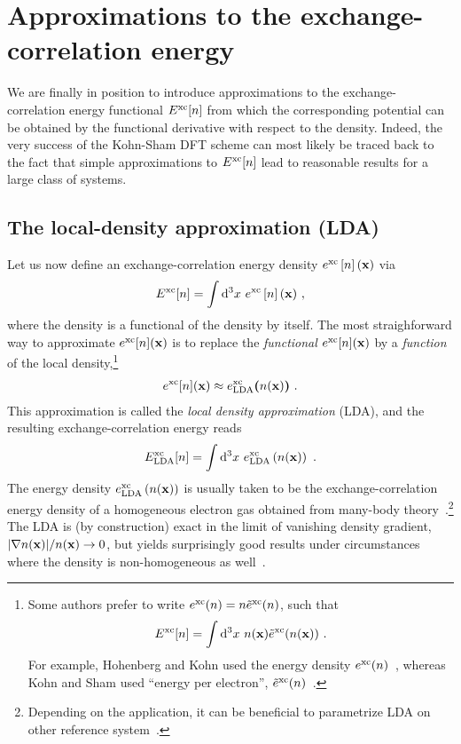 \section{Approximations to the exchange-correlation energy}
\label{sec:dft.approximations}
We are finally in position to introduce approximations to the exchange-correlation energy functional $E^{\rm xc}[n]$ from which the corresponding potential can be obtained by the functional derivative with respect to the density. Indeed, the very success of the Kohn-Sham DFT scheme can most likely be traced back to the fact that simple approximations to $E^{\rm xc}[n]$ lead to reasonable results for a large class of systems. 

\subsection{The local-density approximation (LDA)}

Let us now define an exchange-correlation energy density $e^{\rm xc} \left[ n \right] ({\bf x})$ via
\begin{align}
	E^{\rm xc}[n] 
		= \int \d^3 x ~ e^{\rm xc} \left[ n \right] ({\bf x})~,
\label{eq:dft.xc.1}
\end{align}
where the density is a functional of the density by itself.
%
The most straighforward way to approximate $e^{\rm xc}[n] ({\bf x})$ is to replace the \emph{functional} $e^{\rm xc} [n] ({\bf x})$ by a \emph{function} of the local density,\footnote{Some authors prefer to write 
  \mbox{$e^{\rm xc}(n) = n \tilde e^{\rm xc} (n)$}, such that
	\begin{align*}
		E^{\rm xc} [n] 
		  = \int {\rm d}^3 x ~ n({\bf x}) \tilde e^{\rm xc} (n ({\bf x}))~.
	\end{align*}
	For example, Hohenberg and Kohn used the energy density $e^{\rm xc} (n)$~\cite{Hohenberg.1964}, whereas Kohn and Sham used ``energy per electron'', $\tilde e^{\rm xc} (n)$~\cite{Kohn.1965}.
	}
%
\begin{align}
	e^{\rm xc} [n] ({\bf x})
		\approx e^{\rm xc}_{\rm LDA} \bm ( n({\bf x}) \bm )~.
	\label{eq:dft.exc.lda.1}
\end{align}
This approximation is called the \emph{local density approximation} (LDA), and the resulting exchange-correlation energy reads
%
\begin{align}
	E^{\rm xc}_{\rm LDA}[n] 
		= \int \d^3 x ~ e^{\rm xc}_{\rm LDA} \left(n ({\bf x}) \right)~.
	\label{eq:dft.LDA.1}
\end{align}
The energy density $e^{\rm xc}_{\rm LDA} \left(n ({\bf x}) \right)$ is usually taken to be the exchange-correlation energy density of a homogeneous electron gas obtained from many-body theory~\cite{Ceperley.1980}.\footnote{Depending on the application, it can be beneficial to parametrize LDA on other reference system~\cite{Nagai.2020}.} The LDA is (by construction) exact in the limit of vanishing density gradient, $\lvert \nabla n ({\bf x}) \rvert / n({\bf x}) \rightarrow 0$, but yields surprisingly good results under circumstances where the density is non-homogeneous as well~\cite[p.\,183]{Dreizler2012}.

